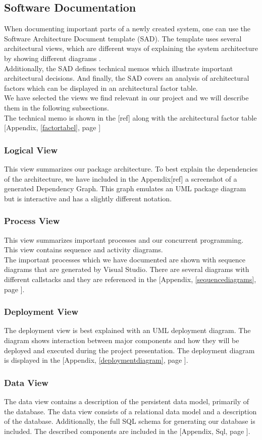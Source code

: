 \subsection{Software Documentation}
When documenting important parts of a newly created system, one can use the Software Architecture Document template (SAD). The template uses several architectural views, which are different ways of explaining the system architecture by showing different diagrams \cite[p.~656]{OOAD}.\\
Additionally, the SAD defines technical memos which illustrate important architectural decisions. And finally, the SAD covers an analysis of architectural factors which can be displayed in an architectural factor table.\\
We have selected the views we find relevant in our project and we will describe them in the following subsections.\\
The technical memo is shown in the [ref] along with the architectural factor table [Appendix, \ref{factortabel}, page \pageref{factortabel}]
\subsubsection{Logical View} 
This view summarizes our package architecture. To best explain the dependencies of the architecture, we have included in the Appendix[ref] a screenshot of a generated Dependency Graph. This graph emulates an UML package diagram but is interactive and has a slightly different notation.\\
\subsubsection{Process View}
This view summarizes important processes and our concurrent programming. This view contains sequence and activity diagrams.\\
The important processes which we have documented are shown with sequence diagrams that are generated by Visual Studio. There are several diagrams
with different callstacks and they are referenced in the [Appendix, \ref{sequencediagrams}, page \pageref{sequencediagrams}]. 
\subsubsection{Deployment View}
The deployment view is best explained with an UML deployment diagram. The diagram shows interaction between major components and how they
will be deployed and executed during the project presentation. The deployment diagram is displayed in the [Appendix, \ref{deploymentdiagram}, page \pageref{deploymentdiagram}].
\subsubsection{Data View}
The data view contains a description of the persistent data model, primarily of the database. The data view consists of a relational data model
and a description of the database. Additionally, the full SQL schema for generating our database is included. The described components are included in the [Appendix, Sql, page \pageref{sql}].